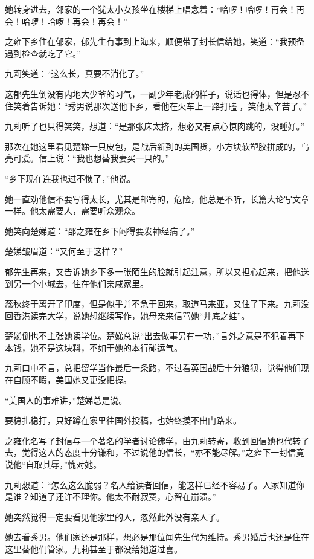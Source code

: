 \par 她转身进去，邻家的一个犹太小女孩坐在楼梯上唱念着：“哈啰！哈啰！再会！再会！哈啰！哈啰！再会！再会！”
\par 之雍下乡住在郁家，郁先生有事到上海来，顺便带了封长信给她，笑道：“我预备遇到检查就吃了它。”
\par 九莉笑道：“这么长，真要不消化了。”
\par 这郁先生倒没有内地大少爷的习气，一副少年老成的样子，说话也得体，但是忍不住笑着告诉她：“秀男说那次送他下乡，看他在火车上一路打瞌𥅻，笑他太辛苦了。”
\par 九莉听了也只得笑笑，想道：“是那张床太挤，想必又有点心惊肉跳的，没睡好。”
\par 那次在她这里看见楚娣一只皮包，是战后新到的美国货，小方块软塑胶拼成的，乌亮可爱。信上说：“我也想替我妻买一只的。”
\par “乡下现在连我也过不惯了，”他说。
\par 她一直劝他信不要写得太长，尤其是邮寄的，危险，他总是不听，长篇大论写文章一样。他太需要人，需要听众观众。
\par 她笑向楚娣道：“邵之雍在乡下闷得要发神经病了。”
\par 楚娣皱眉道：“又何至于这样？”
\par 郁先生再来，又告诉她乡下多一张陌生的脸就引起注意，所以又担心起来，把他送到另一个小城去，住在他们亲戚家里。
\par 蕊秋终于离开了印度，但是似乎并不急于回来，取道马来亚，又住了下来。九莉没回香港读完大学，说她想继续写作，她母亲来信骂她“井底之蛙”。
\par 楚娣倒也不主张她读学位。楚娣总说“出去做事另有一功，”言外之意是不犯着再下本钱，她不是这块料，不如干她的本行碰运气。
\par 九莉口中不言，总把留学当作最后一条路，不过看英国战后十分狼狈，觉得他们现在自顾不暇，美国她又更没把握。
\par “美国人的事难讲，”楚娣总是说。
\par 要稳扎稳打，只好蹲在家里往国外投稿，也始终摸不出门路来。
\par 之雍化名写了封信与一个著名的学者讨论佛学，由九莉转寄，收到回信她也代转了去，觉得这人的态度十分谦和，不过说他的信长，“亦不能尽解。”之雍下一封信竟说他“自取其辱，”愧对她。
\par 九莉想道：“怎么这么脆弱？名人给读者回信，能这样已经不容易了。人家知道你是谁？知道了还许不理你。他太不耐寂寞，心智在崩溃。”
\par 她突然觉得一定要看见他家里的人，忽然此外没有亲人了。
\par 她去看秀男。他们家还是那样，想必是那位闻先生代为维持。秀男婚后也还是住在这里替他们管家。九莉甚至于都没给她道过喜。
